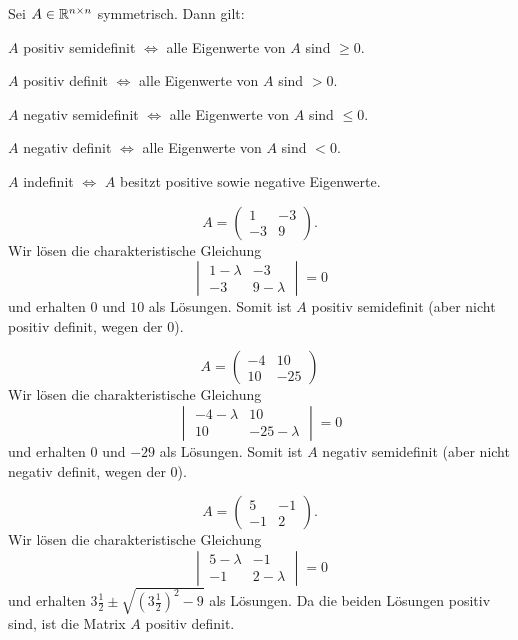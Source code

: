 \begin{thm}
	Sei $A \in \mathbb{R}^{n \times n}$ symmetrisch. Dann gilt: 
	\begin{enuma}
		\item $A$ positiv semidefinit $\Leftrightarrow$ alle Eigenwerte von $A$ sind $\ge 0$. 
		\item $A$ positiv definit $\Leftrightarrow$ alle Eigenwerte von $A$ sind $>0$. 
		\item $A$ negativ semidefinit $\Leftrightarrow$ alle Eigenwerte von $A$ sind $\le 0$. 
		\item $A$ negativ definit $\Leftrightarrow$ alle Eigenwerte von $A$ sind $<0$. 
		\item $A$ indefinit $\Leftrightarrow$ $A$ besitzt positive sowie negative Eigenwerte. 
	\end{enuma} 
\end{thm} 

\begin{bsp}
	\[
		A = \begin{pmatrix} 1 & -3 \\ -3  & 9 \end{pmatrix}.
	\]
	Wir lösen die charakteristische Gleichung 
	\[
		\begin{vmatrix} 1 - \lambda & -3 \\ -3 & 9 - \lambda \end{vmatrix} =0
	\]
	und erhalten $0$ und $10$ als Lösungen. Somit ist $A$ positiv semidefinit (aber nicht positiv definit, wegen der $0$). 
\end{bsp} 

\begin{bsp}
	\[
		A = \begin{pmatrix} -4 & 10 \\ 10  & -25 \end{pmatrix}
	\]
	Wir lösen die charakteristische Gleichung 
	\[
	\begin{vmatrix} -4 - \lambda & 10 \\ 10 & -25 - \lambda \end{vmatrix} =0
	\]
	und erhalten $0$ und $-29$ als Lösungen. Somit ist $A$ negativ semidefinit (aber nicht negativ definit, wegen der $0$). 
\end{bsp} 

\begin{bsp}
	\[
		A = \begin{pmatrix} 5 & -1 \\ -1 & 2 \end{pmatrix}. 
	\]
	Wir lösen die charakteristische Gleichung 
	\[
		\begin{vmatrix} 5 - \lambda & - 1 \\ -1 & 2 - \lambda \end{vmatrix} = 0 
	\]
	und erhalten $3 \frac{1}{2} \pm \sqrt{ ( 3 \frac{1}{2})^2 - 9 }$ als Lösungen. Da die beiden Lösungen positiv sind, ist die Matrix $A$ positiv definit. 
\end{bsp} 

